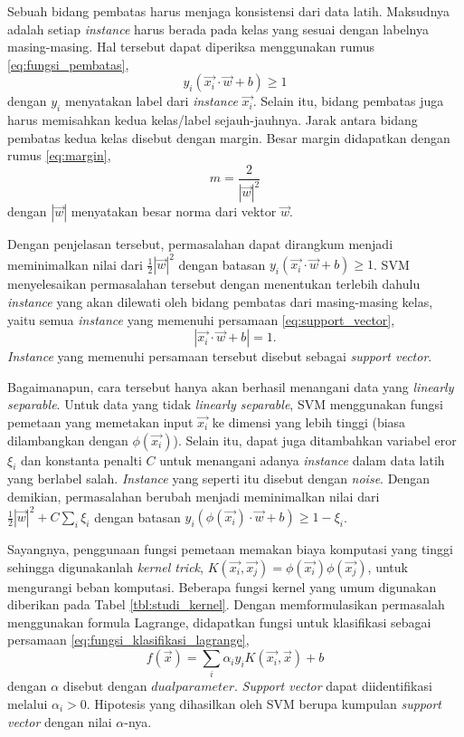 \documentclass[../main/main.tex]{subfiles}
\begin{document}
Sebuah bidang pembatas harus menjaga konsistensi dari data latih. Maksudnya adalah setiap \textit{instance} harus berada pada kelas yang sesuai dengan labelnya masing-masing. Hal tersebut dapat diperiksa menggunakan rumus \ref{eq:fungsi_pembatas},
\begin{equation} \label{eq:fungsi_pembatas}
y_i(\vec{x_i} \cdot \vec{w} + b) \geq 1
\end{equation}
dengan $y_i$ menyatakan label dari \textit{instance} $\vec{x_i}$. Selain itu, bidang pembatas juga harus memisahkan kedua kelas/label sejauh-jauhnya. Jarak antara bidang pembatas kedua kelas disebut dengan margin. Besar margin didapatkan dengan rumus \ref{eq:margin},
\begin{equation} \label{eq:margin}
m = \frac{2}{|\vec{w}|^2}
\end{equation}
dengan $|\vec{w}|$ menyatakan besar norma dari vektor $\vec{w}$.

Dengan penjelasan tersebut, permasalahan dapat dirangkum menjadi meminimalkan nilai dari $\frac{1}{2}|\vec{w}|^2$ dengan batasan $y_i(\vec{x_i} \cdot \vec{w} + b) \geq 1$. SVM menyelesaikan permasalahan tersebut dengan menentukan terlebih dahulu \textit{instance} yang akan dilewati oleh bidang pembatas dari masing-masing kelas, yaitu semua \textit{instance} yang memenuhi persamaan \ref{eq:support_vector},
\begin{equation} \label{eq:support_vector}
|\vec{x_i} \cdot \vec{w} + b| = 1.
\end{equation}
\textit{Instance} yang memenuhi persamaan tersebut disebut sebagai \textit{support vector}.

Bagaimanapun, cara tersebut hanya akan berhasil menangani data yang \textit{linearly separable}. Untuk data yang tidak \textit{linearly separable}, SVM menggunakan fungsi pemetaan yang memetakan input $\vec{x_i}$ ke dimensi yang lebih tinggi (biasa dilambangkan dengan $\phi(\vec{x_i})$). Selain itu, dapat juga ditambahkan variabel eror $\xi_i$ dan konstanta penalti $C$ untuk menangani adanya \textit{instance} dalam data latih yang berlabel salah. \textit{Instance} yang seperti itu disebut dengan \textit{noise}. Dengan demikian, permasalahan berubah menjadi meminimalkan nilai dari $\frac{1}{2}|\vec{w}|^2 + C\sum_{i} \xi_i$ dengan batasan $y_i(\phi(\vec{x_i}) \cdot \vec{w} + b) \geq 1 - \xi_i$.

Sayangnya, penggunaan fungsi pemetaan memakan biaya komputasi yang tinggi sehingga digunakanlah \textit{kernel trick}, $K(\vec{x_i}, \vec{x_j}) = \phi(\vec{x_i})\phi(\vec{x_j})$, untuk mengurangi beban komputasi. Beberapa fungsi kernel yang umum digunakan diberikan pada Tabel \ref{tbl:studi_kernel}. Dengan memformulasikan permasalah menggunakan formula Lagrange, didapatkan fungsi untuk klasifikasi sebagai persamaan \ref{eq:fungsi_klasifikasi_lagrange},
\begin{equation} \label{eq:fungsi_klasifikasi_lagrange}
f(\vec{x}) = \sum_i \alpha_i y_i K(\vec{x_i}, \vec{x}) + b
\end{equation}
dengan $\alpha$ disebut dengan $dual parameter$. \textit{Support vector} dapat diidentifikasi melalui $\alpha_i > 0$. Hipotesis yang dihasilkan oleh SVM berupa kumpulan \textit{support vector} dengan nilai $\alpha$-nya.
\end{document}
